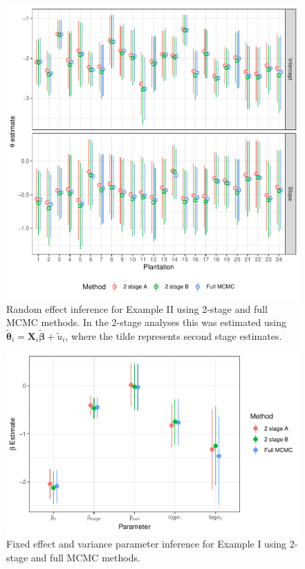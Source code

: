 \documentclass[12pt]{article}
\newcommand{\bt}{\boldsymbol{\theta}}
\newcommand{\bb}{\boldsymbol{\beta}}
\newcommand{\bX}{\mathbf{X}}
\begin{document}

%

\clearpage

\begin{figure}
\includegraphics[width=6.5in]{plt_theta}
\caption{\label{fig:theta.re}Random effect inference for Example II using 2-stage and full MCMC methods. In the 2-stage analyses this was estimated using $\tilde{\bt}_i = \bX_i\tilde{\bb} + \tilde{u}_i$, where the tilde represents second stage estimates.}
\end{figure}

\clearpage

\begin{figure}
\includegraphics[width=6.5in]{fixpar}
\caption{\label{fig:fixed.re}Fixed effect and variance parameter inference for Example I using 2-stage and full MCMC methods.}
\end{figure}
\end{document}
